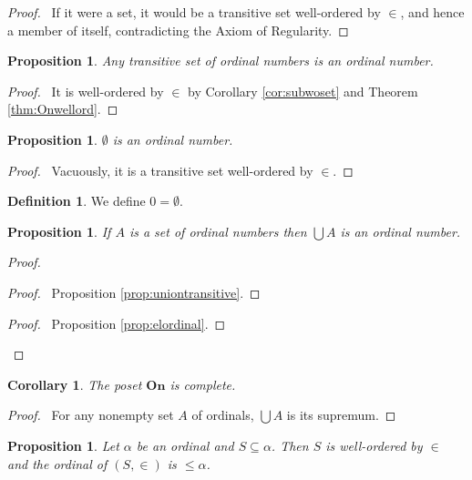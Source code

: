 \documentclass{book}
\let\qed\relax
\newtheorem{prop}[ax]{Proposition}
\newtheorem{cor}{Corollary}[ax]
\theoremstyle{definition}
\newtheorem{df}[ax]{Definition}
\begin{document}
\begin{proof}
\pf\ If it were a set, it would be a transitive set well-ordered by $\in$, and hence a member of itself, contradicting the Axiom of Regularity.
\end{proof}

\begin{prop}
Any transitive set of ordinal numbers is an ordinal number.
\end{prop}

\begin{proof}
\pf\ It is well-ordered by $\in$ by Corollary \ref{cor:subwoset} and Theorem \ref{thm:Onwellord}. \qed
\end{proof}

\begin{prop}
$\emptyset$ is an ordinal number.
\end{prop}

\begin{proof}
\pf\ Vacuously, it is a transitive set well-ordered by $\in$.
\end{proof}

\begin{df}
We define $0 = \emptyset$.
\end{df}

\begin{prop}
If $A$ is a set of ordinal numbers then $\bigcup A$ is an ordinal number.
\end{prop}

\begin{proof}
\pf
{}
\begin{proof}
	\pf\ Proposition \ref{prop:uniontransitive}.
\end{proof}
\begin{proof}
	\pf\ Proposition \ref{prop:elordinal}.
\end{proof}
\qed
\end{proof}

\begin{cor}
The poset $\mathbf{On}$ is complete.
\end{cor}

\begin{proof}
\pf\ For any nonempty set $A$ of ordinals, $\bigcup A$ is its supremum. \qed
\end{proof}

\begin{prop}
\label{prop:subsetleq}
Let $\alpha$ be an ordinal and $S \subseteq \alpha$. Then $S$ is well-ordered by $\in$ and the ordinal of $(S, \in)$ is $\leq \alpha$.
\end{prop}
\end{document}
